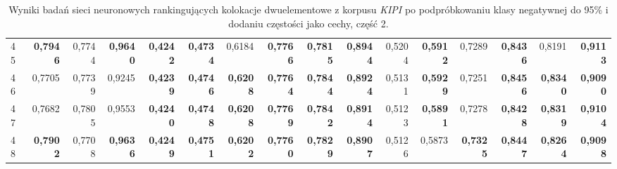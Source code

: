 \begin{table}[htp!]
\begin{adjustwidth}{-2cm}{}
\begin{tabular}{ l | *{15}{| r}}
45	&	\textbf{0,7946}	&	0,7744	&	\textbf{0,9640}	&	\textbf{0,4242}	&	\textbf{0,4734}	&	0,6184	&	\textbf{0,7766}	&	\textbf{0,7815}	&	\textbf{0,8944}	&	0,5204	&	\textbf{0,5912}	&	0,7289	&	\textbf{0,8436}	&	0,8191	&	\textbf{0,9113}	\\
46	&	0,7705	&	0,7739	&	0,9245	&	\textbf{0,4239}	&	\textbf{0,4746}	&	\textbf{0,6208}	&	\textbf{0,7764}	&	\textbf{0,7844}	&	\textbf{0,8924}	&	0,5131	&	\textbf{0,5929}	&	0,7251	&	\textbf{0,8456}	&	\textbf{0,8340}	&	\textbf{0,9090}	\\
47	&	0,7682	&	0,7805	&	0,9553	&	\textbf{0,4240}	&	\textbf{0,4748}	&	\textbf{0,6208}	&	\textbf{0,7769}	&	\textbf{0,7842}	&	\textbf{0,8914}	&	0,5123	&	\textbf{0,5891}	&	0,7278	&	\textbf{0,8428}	&	\textbf{0,8319}	&	\textbf{0,9104}	\\
48	&	\textbf{0,7902}	&	0,7708	&	\textbf{0,9636}	&	\textbf{0,4249}	&	\textbf{0,4751}	&	\textbf{0,6202}	&	\textbf{0,7760}	&	\textbf{0,7829}	&	\textbf{0,8907}	&	0,5126	&	0,5873	&	\textbf{0,7325}	&	\textbf{0,8447}	&	\textbf{0,8264}	&	\textbf{0,9098}	\\
	\bottomrule
\end{tabular}
 \end{adjustwidth}
\caption[Wyniki badań sieci neuronowych rankingujących kolokacje dwuelementowe z korpusu \emph{KIPI} po podpróbkowaniu klasy negatywnej do 95\% i dodaniu częstości jako cechy, część 2]{Wyniki badań sieci neuronowych rankingujących kolokacje dwuelementowe z korpusu \emph{KIPI} po podpróbkowaniu klasy negatywnej do 95\% i dodaniu częstości jako cechy, część 2.}
\label{KIPI_sub5_nn_add_freq_part_2}
\end{table}

